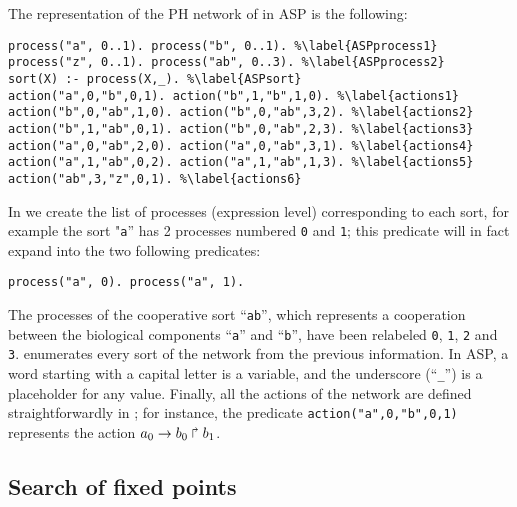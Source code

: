 \begin{example}
\label{ex:asp-ph}
The representation of the PH network of  in ASP is the following:
\begin{lstlisting}
process("a", 0..1). process("b", 0..1). %\label{ASPprocess1}
process("z", 0..1). process("ab", 0..3). %\label{ASPprocess2}
sort(X) :- process(X,_). %\label{ASPsort}
action("a",0,"b",0,1). action("b",1,"b",1,0). %\label{actions1}
action("b",0,"ab",1,0). action("b",0,"ab",3,2). %\label{actions2}
action("b",1,"ab",0,1). action("b",0,"ab",2,3). %\label{actions3}
action("a",0,"ab",2,0). action("a",0,"ab",3,1). %\label{actions4}
action("a",1,"ab",0,2). action("a",1,"ab",1,3). %\label{actions5}
action("ab",3,"z",0,1). %\label{actions6}
\end{lstlisting}
In  we create the list of processes (expression level) corresponding to each sort,
for example the sort "\texttt{a}'' has 2 processes numbered \texttt{0} and \texttt{1};
this predicate will in fact expand into the two following predicates:
\begin{lstlisting}[numbers=none]
process("a", 0). process("a", 1).
\end{lstlisting}
The processes of the cooperative sort ``\texttt{ab}'',
which represents a cooperation between the biological components ``\texttt{a}'' and ``\texttt{b}'',
have been relabeled \texttt{0}, \texttt{1}, \texttt{2} and \texttt{3}.
 enumerates every sort of the network from the previous information.
In ASP, a word starting with a capital letter is a variable,
and the underscore (``\texttt{\_}'') is a placeholder for any value.
Finally, all the actions of the network are defined straightforwardly in ;
for instance, the predicate \texttt{action("a",0,"b",0,1)} represents the action
$a_0\rightarrow b_0\Rsh b_1$.
\end{example}

\subsection{Search of fixed points}


